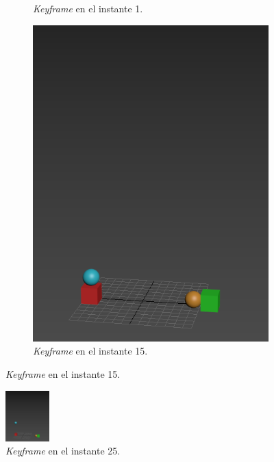 \documentclass{article}
\begin{document}
\begin{figure}
\begin{subfigure}[H]{0.15\textwidth}
	    \caption{\textit{Keyframe} en el instante 1.}
	\end{subfigure}   
    \hfill
	\begin{subfigure}[H]{0.15\textwidth}
	    \centering
	    \includegraphics[width=\textwidth]{imagenes/p1_ins15.png}
	    \caption{\textit{Keyframe} en el instante 15.}
	\end{subfigure}
\end{figure}




\begin{figure}[H]
    \centering
    \includegraphics[width=0.15\textwidth]{imagenes/p1_ins25.png}
    \caption{\textit{Keyframe} en el instante 25.}
\end{figure}
\end{document}
